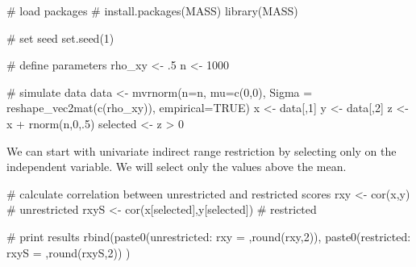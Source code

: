 \documentclass[
  letterpaper,
  DIV=11,
  numbers=noendperiod]{scrreprt}
\newenvironment{Shaded}{\begin{snugshade}}{\end{snugshade}}
\newcommand{\AttributeTok}[1]{\textcolor[rgb]{0.40,0.45,0.13}{#1}}
\newcommand{\CommentTok}[1]{\textcolor[rgb]{0.37,0.37,0.37}{#1}}
\newcommand{\ConstantTok}[1]{\textcolor[rgb]{0.56,0.35,0.01}{#1}}
\newcommand{\DecValTok}[1]{\textcolor[rgb]{0.68,0.00,0.00}{#1}}
\newcommand{\FunctionTok}[1]{\textcolor[rgb]{0.28,0.35,0.67}{#1}}
\newcommand{\NormalTok}[1]{\textcolor[rgb]{0.00,0.23,0.31}{#1}}
\newcommand{\OtherTok}[1]{\textcolor[rgb]{0.00,0.23,0.31}{#1}}
\newcommand{\SpecialCharTok}[1]{\textcolor[rgb]{0.37,0.37,0.37}{#1}}
\newcommand{\StringTok}[1]{\textcolor[rgb]{0.13,0.47,0.30}{#1}}
\begin{document}
\begin{Shaded}
\begin{Highlighting}[]
\CommentTok{\# load packages}
\CommentTok{\# install.packages(\textquotesingle{}MASS\textquotesingle{})}
\FunctionTok{library}\NormalTok{(MASS)}

\CommentTok{\# set seed}
\FunctionTok{set.seed}\NormalTok{(}\DecValTok{1}\NormalTok{)}

\CommentTok{\# define parameters}
\NormalTok{rho\_xy }\OtherTok{\textless{}{-}}\NormalTok{ .}\DecValTok{5}
\NormalTok{n }\OtherTok{\textless{}{-}} \DecValTok{1000}

\CommentTok{\# simulate data}
\NormalTok{data }\OtherTok{\textless{}{-}} \FunctionTok{mvrnorm}\NormalTok{(}\AttributeTok{n=}\NormalTok{n,}
                \AttributeTok{mu=}\FunctionTok{c}\NormalTok{(}\DecValTok{0}\NormalTok{,}\DecValTok{0}\NormalTok{),}
                \AttributeTok{Sigma =} \FunctionTok{reshape\_vec2mat}\NormalTok{(}\FunctionTok{c}\NormalTok{(rho\_xy)),}
                \AttributeTok{empirical=}\ConstantTok{TRUE}\NormalTok{)}
\NormalTok{x }\OtherTok{\textless{}{-}}\NormalTok{ data[,}\DecValTok{1}\NormalTok{]}
\NormalTok{y }\OtherTok{\textless{}{-}}\NormalTok{ data[,}\DecValTok{2}\NormalTok{]}
\NormalTok{z }\OtherTok{\textless{}{-}}\NormalTok{ x }\SpecialCharTok{+} \FunctionTok{rnorm}\NormalTok{(n,}\DecValTok{0}\NormalTok{,.}\DecValTok{5}\NormalTok{)}
\NormalTok{selected }\OtherTok{\textless{}{-}}\NormalTok{ z }\SpecialCharTok{\textgreater{}} \DecValTok{0}
\end{Highlighting}
\end{Shaded}

We can start with univariate indirect range restriction by selecting
only on the independent variable. We will select only the values above
the mean.

\begin{Shaded}
\begin{Highlighting}[]
\CommentTok{\# calculate correlation between unrestricted and restricted scores}
\NormalTok{rxy }\OtherTok{\textless{}{-}} \FunctionTok{cor}\NormalTok{(x,y) }\CommentTok{\# unrestricted}
\NormalTok{rxyS }\OtherTok{\textless{}{-}} \FunctionTok{cor}\NormalTok{(x[selected],y[selected]) }\CommentTok{\# restricted}

\CommentTok{\# print results}
\FunctionTok{rbind}\NormalTok{(}\FunctionTok{paste0}\NormalTok{(}\StringTok{\textquotesingle{}unrestricted: rxy = \textquotesingle{}}\NormalTok{,}\FunctionTok{round}\NormalTok{(rxy,}\DecValTok{2}\NormalTok{)),}
      \FunctionTok{paste0}\NormalTok{(}\StringTok{\textquotesingle{}restricted: rxyS = \textquotesingle{}}\NormalTok{,}\FunctionTok{round}\NormalTok{(rxyS,}\DecValTok{2}\NormalTok{))}
\NormalTok{      )}
\end{Highlighting}
\end{Shaded}
\end{document}
